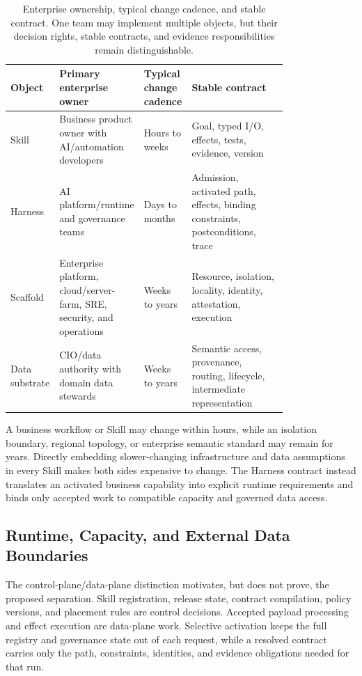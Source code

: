 \begin{table}[t]
\centering
\caption{Enterprise ownership, typical change cadence, and stable contract. One team may implement multiple objects, but their decision rights, stable contracts, and evidence responsibilities remain distinguishable.}
\label{tab:ownership-cadence}
\begin{tabular}{lp{0.26\linewidth}p{0.15\linewidth}p{0.38\linewidth}}
\hline
Object & Primary enterprise owner & Typical change cadence & Stable contract \\
\hline
Skill & Business product owner with AI/automation developers & Hours to weeks & Goal, typed I/O, effects, tests, evidence, version \\
Harness & AI platform/runtime and governance teams & Days to months & Admission, activated path, effects, binding constraints, postconditions, trace \\
Scaffold & Enterprise platform, cloud/server-farm, SRE, security, and operations & Weeks to years & Resource, isolation, locality, identity, attestation, execution \\
Data substrate & CIO/data authority with domain data stewards & Weeks to years & Semantic access, provenance, routing, lifecycle, intermediate representation \\
\hline
\end{tabular}
\end{table}

A business workflow or Skill may change within hours, while an isolation boundary, regional topology, or enterprise semantic standard may remain for years. Directly embedding slower-changing infrastructure and data assumptions in every Skill makes both sides expensive to change. The Harness contract instead translates an activated business capability into explicit runtime requirements and binds only accepted work to compatible capacity and governed data access.

\subsection{Runtime, Capacity, and External Data Boundaries}

The control-plane/data-plane distinction motivates, but does not prove, the proposed separation. Skill registration, release state, contract compilation, policy versions, and placement rules are control decisions. Accepted payload processing and effect execution are data-plane work. Selective activation keeps the full registry and governance state out of each request, while a resolved contract carries only the path, constraints, identities, and evidence obligations needed for that run.

